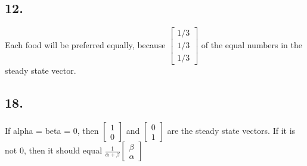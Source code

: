 \documentclass[12]{scrartcl}
\begin{document}
\subsection*{12.}
Each food will be preferred equally, because $\begin{bmatrix}  1/3 \\ 1/3 \\ 1/3  \end{bmatrix} $ of the equal numbers in the steady state vector. 
\subsection*{18.}
If alpha = beta = 0, then $\begin{bmatrix}  1\\ 0  \end{bmatrix} $ and $\begin{bmatrix}  0\\ 1  \end{bmatrix} $ are the steady state vectors. If it is not 0, then it should equal $\frac{1}{\alpha + \beta} \begin{bmatrix}  \beta \\ \alpha  \end{bmatrix}$
\end{document}
